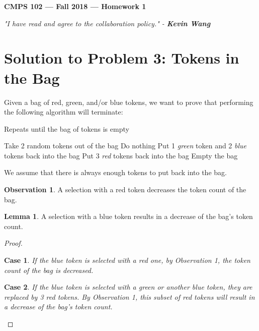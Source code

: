 \documentclass[11pt]{article}
\theoremstyle{definition}
\newtheorem{lemma}{Lemma}
\newtheorem{observation}{Observation}
\theoremstyle{plain}
\theoremstyle{indented-remark}
\newtheorem{case}{Case}
\theoremstyle{indented-proof}
\begin{document}
\begin{center}
{\bf\Large CMPS 102 --- Fall 2018 ---  Homework 1}
\end{center}

\begin{center}
\textit{"I have read and agree to the collaboration policy." - \textbf{Kevin Wang}}
\end{center}

\section*{Solution to Problem 3: Tokens in the Bag}

Given a bag of red, green, and/or blue tokens, we want to prove that performing the following algorithm will terminate:

\begin{algorithm}
\caption{Repeats until the bag of tokens is empty}
\begin{algorithmic} 
\STATE Take 2 random tokens out of the bag
\STATE Do nothing
\STATE Put 1 \textit{green} token and 2 \textit{blue} tokens back into the bag
\STATE Put 3 \textit{red} tokens back into the bag
\ENDIF
{}
\STATE Empty the bag
\end{algorithmic}
\end{algorithm}

\noindent We assume that there is always enough tokens to put back into the bag.

\begin{observation}
A selection with a red token decreases the token count of the bag.
\end{observation}

\begin{lemma}
A selection with a blue token results in a decrease of the bag's token count.
\begin{proof}
\begin{case}
If the blue token is selected with a red one, by Observation 1, the token count of the bag is decreased. 
\end{case}
\begin{case}
If the blue token is selected with a green or another blue token, they are replaced by 3 red tokens. By Observation 1, this subset of red tokens will result in a decrease of the bag's token count.
\end{case}
\end{proof}
\end{lemma}
\end{document}
